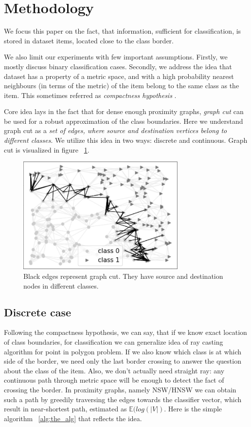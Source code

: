 \section{Methodology}\label{sec:METHOD}

We focus this paper on the fact, that information, sufficient for classification, is stored in dataset items, located close to the class border. 

We also limit our experiments with few important assumptions. Firstly, we mostly discuss binary classification cases. Secondly, we address the idea that dataset has a property of a metric space, and with a high probability nearest neighbours (in terms of the metric) of the item belong to the same class as the item. This sometimes referred as \emph{compactness hypothesis} \cite{compactness}.

Core idea lays in the fact that for dense enough proximity graphs, \emph{graph cut} can be used for a robust approximation of the class boundaries. Here we understand graph cut as a \emph{set of edges, where source and destination vertices belong to different classes}. We utilize this idea in two ways: discrete and continuous. Graph cut is visualized in figure ~\ref{fig:cut}.

\begin{figure}
    \includegraphics[width=3.3in]{paper/images/00_cut.png}
    \caption{Black edges represent graph cut. They have source and destination nodes in different classes.}
    \label{fig:cut}
\end{figure}

\subsection{Discrete case}

Following the compactness hypothesis, we can say, that if we know exact location of class boundaries, for classification we can generalize idea of ray casting algorithm for point in polygon problem. If we also know which class is at which side of the border, we need only the last border crossing to answer the question about the class of the item. Also, we don't actually need straight ray: any continuous path through metric space will be enough to detect the fact of crossing the border. In proximity graphs, namely NSW/HNSW we can obtain such a path by greedily traversing the edges towards the classifier vector, which result in near-shortest path, estimated as $\mathbb{E}(log(|V|)$. Here is the simple algorithm ~\ref{alg:the_alg} that reflects the idea.

